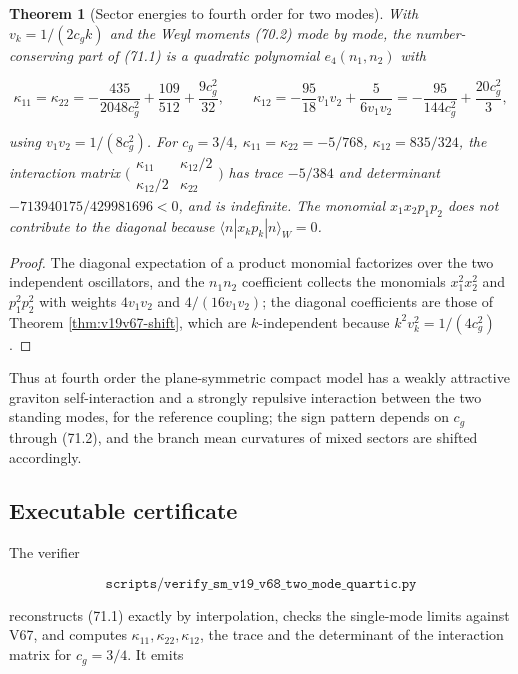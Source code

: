\documentclass[11pt]{article}
\newtheorem{theorem}{Theorem}[section]
\theoremstyle{remark}
\begin{document}
\begin{theorem}[Sector energies to fourth order for two modes]
\label{thm:v19v68-energies}
With \(v_k=1/(2c_gk)\) and the Weyl moments (70.2) mode by mode, the
number-conserving part of (71.1) is a quadratic polynomial
\(e_4(n_1,n_2)\) with

\[
 \kappa_{11}=\kappa_{22}=-\frac{435}{2048c_g^2}+\frac{109}{512}+\frac{9c_g^2}{32},
 \qquad
 \kappa_{12}=-\frac{95}{18}v_1v_2+\frac{5}{6v_1v_2}
 =-\frac{95}{144c_g^2}+\frac{20c_g^2}{3},
                                                                    \tag{71.2}
\]

using \(v_1v_2=1/(8c_g^2)\).  For \(c_g=3/4\),
\(\kappa_{11}=\kappa_{22}=-5/768\), \(\kappa_{12}=835/324\), the
interaction matrix \(\bigl(\begin{smallmatrix}\kappa_{11}&\kappa_{12}/2\\ \kappa_{12}/2&\kappa_{22}\end{smallmatrix}\bigr)\)
has trace \(-5/384\) and determinant \(-713940175/429981696<0\), and is
indefinite.  The monomial \(x_1x_2p_1p_2\) does not contribute to the
diagonal because \(\langle n|x_kp_k|n\rangle_W=0\).
\end{theorem}

\begin{proof}
The diagonal expectation of a product monomial factorizes over the two
independent oscillators, and the \(n_1n_2\) coefficient collects the
monomials \(x_1^2x_2^2\) and \(p_1^2p_2^2\) with weights
\(4v_1v_2\) and \(4/(16v_1v_2)\); the diagonal coefficients are those of
Theorem \ref{thm:v19v67-shift}, which are \(k\)-independent because
\(k^2v_k^2=1/(4c_g^2)\).
\end{proof}

Thus at fourth order the plane-symmetric compact model has a weakly
attractive graviton self-interaction and a strongly repulsive
interaction between the two standing modes, for the reference coupling;
the sign pattern depends on \(c_g\) through (71.2), and the branch
mean curvatures of mixed sectors are shifted accordingly.

\subsection{Executable certificate}

The verifier

\[
 \texttt{scripts/verify\_sm\_v19\_v68\_two\_mode\_quartic.py}        \tag{71.3}
\]

reconstructs (71.1) exactly by interpolation, checks the single-mode
limits against V67, and computes \(\kappa_{11},\kappa_{22},\kappa_{12}\),
the trace and the determinant of the interaction matrix for
\(c_g=3/4\).  It emits
\end{document}
